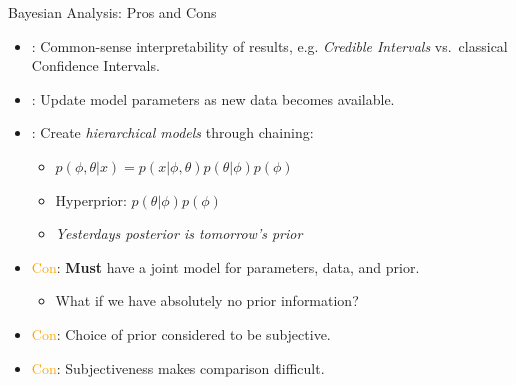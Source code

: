 \documentclass[ignorenonframetext,]{beamer}
\providecommand{\tightlist}{%
  \setlength{\itemsep}{0pt}\setlength{\parskip}{0pt}}
\newcommand{\HIGHLIGHT}[1]{\noindent{\color{blue}#1}}
\newcommand{\orange}[1]{\textcolor{orange}{#1}}
\begin{document}
\begin{frame}{Bayesian Analysis: Pros and Cons}

\begin{itemize}
\item
  \HIGHLIGHT{Pro}: Common-sense interpretability of results, e.g.
  \emph{Credible Intervals} vs.~classical Confidence Intervals.
\item
  \HIGHLIGHT{Pro}: Update model parameters as new data becomes
  available.
\item
  \HIGHLIGHT{Pro}: Create \emph{hierarchical models} through chaining:

  \begin{itemize}
  \tightlist
  \item
    \(p(\phi, \theta | x) = p(x |\phi, \theta) p(\theta | \phi) p(\phi)\)
  \item
    Hyperprior: \(p(\theta | \phi) p(\phi)\)
  \item
    \emph{Yesterdays posterior is tomorrow's prior}
  \end{itemize}
\item
  \orange{Con}: \textbf{Must} have a joint model for parameters, data,
  and prior.

  \begin{itemize}
  \tightlist
  \item
    What if we have absolutely no prior information?
  \end{itemize}
\item
  \orange{Con}: Choice of prior considered to be subjective.
\item
  \orange{Con}: Subjectiveness makes comparison difficult.
\end{itemize}

\end{frame}
\end{document}

